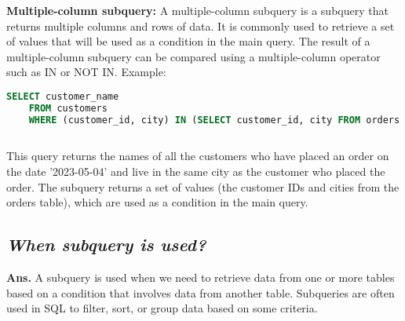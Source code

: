 \documentclass{article}
\begin{document}
\textbf{Multiple-column subquery:}
A multiple-column subquery is a subquery that returns multiple columns and rows of data. It is commonly used to retrieve a set of values that will be used as a condition in the main query. The result of a multiple-column subquery can be compared using a multiple-column operator such as IN or NOT IN.
Example:
\begin{lstlisting}[language=SQL]
    SELECT customer_name
    FROM customers
    WHERE (customer_id, city) IN (SELECT customer_id, city FROM orders WHERE order_date = '2023-05-04');
    
\end{lstlisting}
This query returns the names of all the customers who have placed an order on the date '2023-05-04' and live in the same city as the customer who placed the order. The subquery returns a set of values (the customer IDs and cities from the orders table), which are used as a condition in the main query.
\subsection{\textit{When subquery is used?}}
\textbf{Ans.} A subquery is used when we need to retrieve data from one or more tables based on a condition that involves data from another table. Subqueries are often used in SQL to filter, sort, or group data based on some criteria.\\
\end{document}
